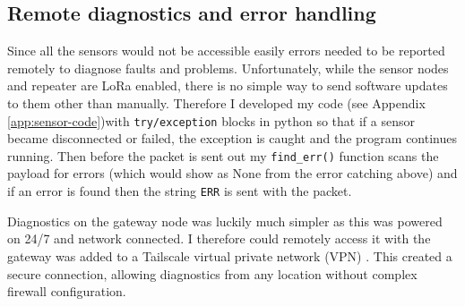 \subsection{Remote diagnostics and error handling}

Since all the sensors would not be accessible easily errors needed to be
reported remotely to diagnose faults and problems. Unfortunately, while the
sensor nodes and repeater are LoRa enabled, there is no simple way to send
software updates to them other than manually. Therefore I developed my code (see
Appendix \ref{app:sensor-code})with \texttt{try/exception} blocks in python so
that if a sensor became disconnected or failed, the exception is caught and the
program continues running. Then before the packet is sent out my
\texttt{find\_err()} function scans the payload for errors (which would show as
None from the error catching above) and if an error is found then the string
\texttt{ERR} is sent with the packet.

Diagnostics on the gateway node was luckily much simpler as this was powered on
24/7 and network connected. I therefore could remotely access it with the
gateway was added to a Tailscale virtual private network (VPN)
\cite{tailscale_2025}. This created a secure connection, allowing diagnostics
from any location without complex firewall configuration.